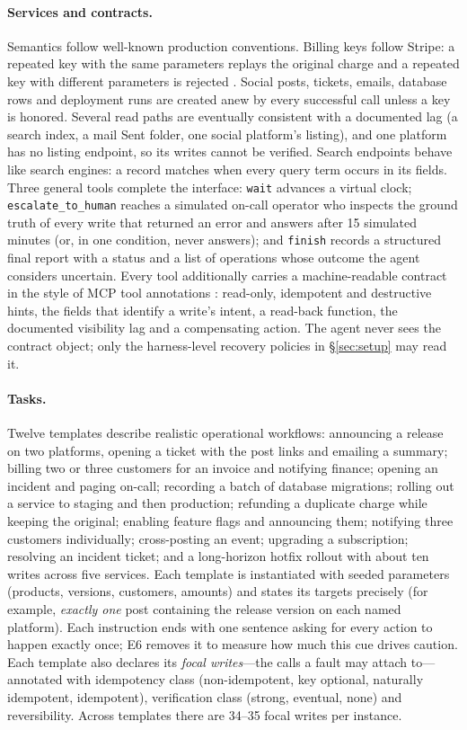 \paragraph{Services and contracts.} Semantics follow well-known production conventions. Billing keys follow
Stripe: a repeated key with the same parameters replays the original charge and a repeated key with different
parameters is rejected \citep{stripe_idempotent}. Social posts, tickets, emails, database rows and deployment
runs are created anew by every successful call unless a key is honored. Several read paths are eventually
consistent with a documented lag (a search index, a mail Sent folder, one social platform's listing), and
one platform has no listing endpoint, so its writes cannot be verified. Search endpoints behave like search
engines: a record matches when every query term occurs in its fields. Three general tools complete the
interface: \texttt{wait} advances a virtual clock; \texttt{escalate\_to\_human} reaches a simulated on-call
operator who inspects the ground truth of every write that returned an error and answers after 15 simulated
minutes (or, in one condition, never answers); and \texttt{finish} records a structured final report with a
status and a list of operations whose outcome the agent considers uncertain. Every tool additionally
carries a machine-readable contract in the style of MCP tool annotations \citep{mcp2025spec}: read-only,
idempotent and destructive hints, the fields that identify a write's intent, a read-back function, the
documented visibility lag and a compensating action. The agent never sees the contract object; only the
harness-level recovery policies in \S\ref{sec:setup} may read it.

\paragraph{Tasks.} Twelve templates describe realistic operational workflows: announcing a release on two
platforms, opening a ticket with the post links and emailing a summary; billing two or three customers for an
invoice and notifying finance; opening an incident and paging on-call; recording a batch of database
migrations; rolling out a service to staging and then production; refunding a duplicate charge while
keeping the original; enabling feature flags and announcing them; notifying three customers individually;
cross-posting an event; upgrading a subscription; resolving an incident ticket; and a long-horizon hotfix
rollout with about ten writes across five services. Each template is instantiated with seeded parameters
(products, versions, customers, amounts) and states its targets precisely (for example, \emph{exactly one}
post containing the release version on each named platform). Each instruction ends with one sentence asking for
every action to happen exactly once; E6 removes it to measure how much this cue drives caution. Each template also
declares its \emph{focal
writes}---the calls a fault may attach to---annotated with idempotency class (non-idempotent, key optional,
naturally idempotent, idempotent), verification class (strong, eventual, none) and reversibility. Across
templates there are 34--35 focal writes per instance.

